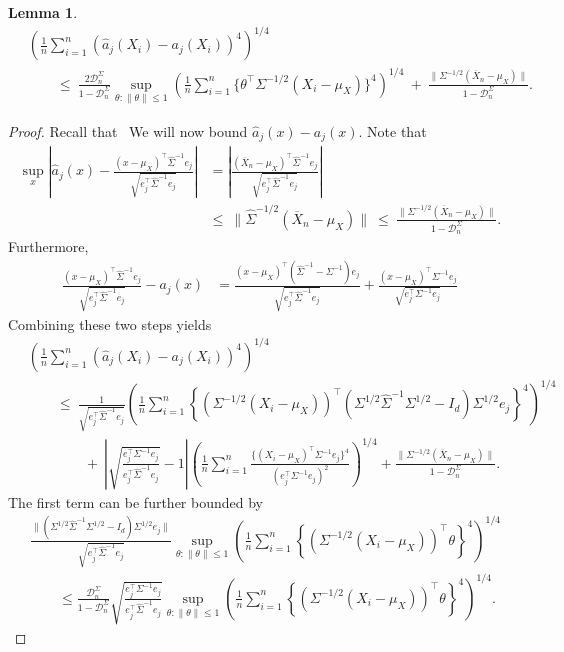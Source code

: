 \documentclass{article}
\newtheorem{lemma}{Lemma}
\begin{document}
\begin{appendices}
\begin{lemma}
\begin{align*}
&\left(\frac{1}{n}\sum_{i=1}^n (\widehat{a}_j(X_i) - a_j(X_i))^4\right)^{1/4}\\ ~&\qquad\le~ \frac{2\mathcal{D}_n^{\Sigma}}{1 - \mathcal{D}_n^{\Sigma}}\sup_{\theta:\|\theta\| \le 1}\left(\frac{1}{n}\sum_{i=1}^n{\{\theta^{\top}\Sigma^{-1/2}(X_i - \mu_X)\}^4}\right)^{1/4} ~+~ \frac{\|\Sigma^{-1/2}(\overline{X}_n - \mu_X)\|}{1 - \mathcal{D}_n^{\Sigma}}.
\end{align*}
\end{lemma}
\begin{proof}
Recall that
\ We will now bound $\widehat{a}_j(x) - a_j(x)$. Note that
\begin{align*}
\sup_{x}\left|\widehat{a}_j(x) - \frac{(x - \mu_{X})^{\top}\widehat{\Sigma}^{-1}e_j}{\sqrt{e_j^{\top}\widehat{\Sigma}^{-1}e_j}}\right| &= \left|\frac{(\overline{X}_n - \mu_X)^{\top}\widehat{\Sigma}^{-1}e_j}{\sqrt{e_j^{\top}\widehat{\Sigma}^{-1}e_j}}\right|\\ ~&\le~ \|\widehat{\Sigma}^{-1/2}(\overline{X}_n - \mu_X)\| ~\le~ \frac{\|\Sigma^{-1/2}(\overline{X}_n - \mu_X)\|}{1 - \mathcal{D}_n^{\Sigma}}.
\end{align*}
Furthermore,
\begin{align*}
\frac{(x - \mu_X)^{\top}\widehat{\Sigma}^{-1}e_j}{\sqrt{e_j^{\top}\widehat{\Sigma}^{-1}e_j}} - a_j(x) &= \frac{(x - \mu_X)^{\top}(\widehat{\Sigma}^{-1} - \Sigma^{-1})e_j}{\sqrt{e_j^{\top}\widehat{\Sigma}^{-1}e_j}} + \frac{(x - \mu_X)^{\top}\Sigma^{-1}e_j}{\sqrt{e_j^{\top}\Sigma^{-1}e_j}}\left.
\end{align*}
Combining these two steps yields
\begin{align*}
&\left(\frac{1}{n}\sum_{i=1}^n (\widehat{a}_j(X_i) - a_j(X_i))^4\right)^{1/4}\\ ~&\qquad\le~ \frac{1}{\sqrt{e_j^{\top}\widehat{\Sigma}^{-1}e_j}}\left(\frac{1}{n}\sum_{i=1}^n \left\{(\Sigma^{-1/2}(X_i - \mu_X))^{\top}(\Sigma^{1/2}\widehat{\Sigma}^{-1}\Sigma^{1/2} - I_d)\Sigma^{1/2}e_j\right\}^4\right)^{1/4}\\ ~&\qquad\qquad+~ \left|\sqrt{\frac{e_j^{\top}\Sigma^{-1}e_j}{e_j^{\top}\widehat{\Sigma}^{-1}e_j}} - 1\right|\left(\frac{1}{n}\sum_{i=1}^n \frac{\{(X_i - \mu_X)^{\top}\Sigma^{-1}e_j\}^4}{(e_j^{\top}\Sigma^{-1}e_j)^2}\right)^{1/4} + \frac{\|\Sigma^{-1/2}(\overline{X}_n - \mu_X)\|}{1 - \mathcal{D}_n^{\Sigma}}.
\end{align*}
The first term can be further bounded by
\begin{align*}
&\frac{\|(\Sigma^{1/2}\widehat{\Sigma}^{-1}\Sigma^{1/2} - I_d)\Sigma^{1/2}e_j\|}{\sqrt{e_j^{\top}\widehat{\Sigma}^{-1}e_j}}\sup_{\theta:\|\theta\| \le 1}\left(\frac{1}{n}\sum_{i=1}^n \left\{(\Sigma^{-1/2}(X_i - \mu_X))^{\top}\theta\right\}^4\right)^{1/4}\\ &\qquad\le \frac{\mathcal{D}_n^{\Sigma}}{1 - \mathcal{D}_n^{\Sigma}}\sqrt{\frac{e_j^{\top}\Sigma^{-1}e_j}{e_j^{\top}\widehat{\Sigma}^{-1}e_j}}\sup_{\theta:\|\theta\| \le 1}\left(\frac{1}{n}\sum_{i=1}^n \left\{(\Sigma^{-1/2}(X_i - \mu_X))^{\top}\theta\right\}^4\right)^{1/4}.

\end{align*}
\end{proof}
\end{appendices}
\end{document}
